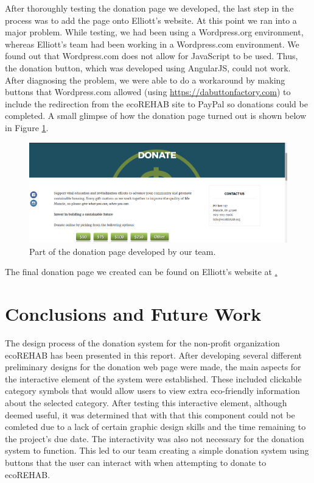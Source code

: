 \documentclass[letter]{article}
\begin{document}
After thoroughly testing the donation page we developed, the last step
in the process was to add the page onto Elliott's website. At this point
we ran into a major problem. While testing, we had been using a
Wordpress.org environment, whereas Elliott's team had been working in a
Wordpress.com environment. We found out that Wordpress.com does not
allow for JavaScript to be used. Thus, the donation button, which was
developed using AngularJS, could not work. After diagnosing the
problem, we were able to do a workaround by making buttons that
Wordpress.com allowed (using \url{https://dabuttonfactory.com}) to
include the redirection from the ecoREHAB site to PayPal so donations
could be completed. A small glimpse of how the donation page turned
out is shown below in Figure \ref{fig:4}.
\begin{figure}[H]
	\includegraphics[scale=0.5]{Donation}
	\captionsetup{justification=centering}
	\centering
	\caption{Part of the donation page developed by our team.}
	\label{fig:4}
\end{figure}
The final donation page we created can be found on Elliott's website at \href{https://loveandtruthiness.wordpress.com/donatevolunteer/donate/}.

\section*{Conclusions and Future Work}
The design process of the donation system for the non-profit
organization ecoREHAB has been presented in this report. After
developing several different preliminary designs for the donation web
page were made, the main aspects for the interactive element of the
system were established. These included clickable category symbols
that would allow users to view extra eco-friendly information about
the selected category. After testing this interactive element,
although deemed useful, it was determined that with that this
component could not be comleted due to a lack of certain graphic
design skills and the time remaining to the project's due date. The
interactivity was also not necessary for the donation system to
function. This led to our team creating a simple donation system using
buttons that the user can interact with when attempting to donate to
ecoREHAB.
\end{document}
